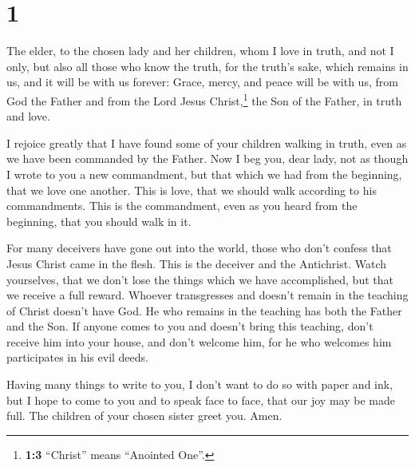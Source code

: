 \hypertarget{section}{%
\section{1}\label{section}}

 The elder, to the chosen lady and her children, whom I
love in truth, and not I only, but also all those who know the truth,
 for the truth's sake, which remains in us, and it will be
with us forever:  Grace, mercy, and peace will be with us,
from God the Father and from the Lord Jesus Christ,\footnote{\textbf{1:3}
  ``Christ'' means ``Anointed One''.} the Son of the Father, in truth
and love.

 I rejoice greatly that I have found some of your children
walking in truth, even as we have been commanded by the Father.
 Now I beg you, dear lady, not as though I wrote to you a
new commandment, but that which we had from the beginning, that we love
one another.  This is love, that we should walk according
to his commandments. This is the commandment, even as you heard from the
beginning, that you should walk in it.

 For many deceivers have gone out into the world, those
who don't confess that Jesus Christ came in the flesh. This is the
deceiver and the Antichrist.  Watch yourselves, that we
don't lose the things which we have accomplished, but that we receive a
full reward.  Whoever transgresses and doesn't remain in
the teaching of Christ doesn't have God. He who remains in the teaching
has both the Father and the Son.  If anyone comes to you
and doesn't bring this teaching, don't receive him into your house, and
don't welcome him,  for he who welcomes him participates
in his evil deeds.

 Having many things to write to you, I don't want to do
so with paper and ink, but I hope to come to you and to speak face to
face, that our joy may be made full.  The children of
your chosen sister greet you. Amen.
